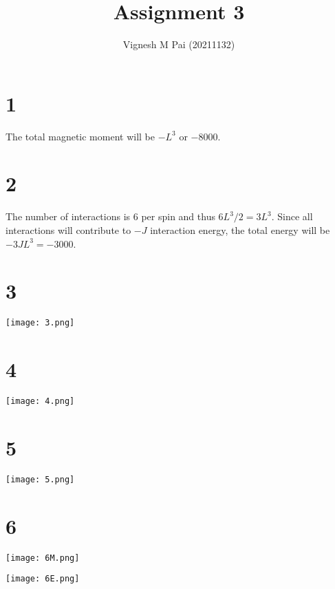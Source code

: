 \documentclass{article}
\title{Assignment 3}
\author{Vignesh M Pai (20211132)}
\date{}
\begin{document}
\maketitle

\section*{1}

The total magnetic moment will be $-L^3$ or $-8000$.

\section*{2}

The number of interactions is $6$ per spin and thus $6L^3 / 2 = 3 L^3$.
Since all interactions will contribute to $-J$ interaction energy, the total energy will be $-3 J L^3 = -3000$.

\section*{3}

\begin{center}
    \texttt{[image: 3.png]}
\end{center}

\section*{4}

\begin{center}
    \texttt{[image: 4.png]}
\end{center}

\section*{5}

\begin{center}
    \texttt{[image: 5.png]}
\end{center}

\section*{6}

\begin{center}
    \texttt{[image: 6M.png]}
\end{center}

\begin{center}
    \texttt{[image: 6E.png]}
\end{center}
\end{document}
